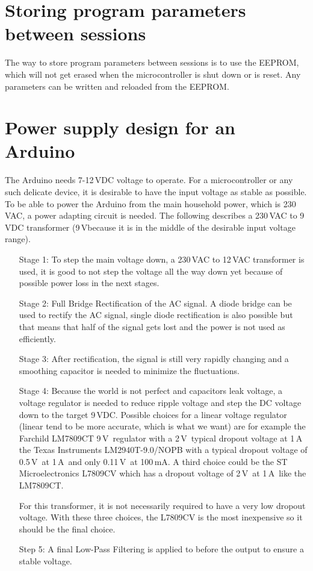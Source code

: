 \documentclass[11pt,a4paper,titlepage]{article}
\newcommand{\A}{\,\textrm{A}}
\newcommand{\mA}{\,\textrm{mA}}
\newcommand{\V}{\,\textrm{V}}
\begin{document}
	
	\section{Storing program parameters between sessions}
	The way to store program parameters between sessions is to use the \textsc{EEPROM}, which will not get erased when the microcontroller is shut down or is reset. Any parameters can be written and reloaded from the \textsc{EEPROM}.
	
	
	\section{Power supply design for an Arduino}
	The Arduino needs  7-12\V DC voltage to operate. For a microcontroller or any such delicate device, it is desirable to have the input voltage as stable as possible. To be able to power the Arduino from the main household power, which is 230\V AC, a power adapting circuit is needed. The following describes a 230\V AC to 9\V DC transformer (9\V because it is in the middle of the desirable input voltage range).
	
	\begin{enumerate}
		\item[Stage 1:]
		To step the main voltage down, a 230\V AC to 12\V AC transformer is used, it is good to not step the voltage all the way down yet because of possible power loss in the next stages.
		\item[Stage 2:]
		Full Bridge Rectification of the AC signal. A diode bridge can be used to rectify the AC signal, single diode rectification is also possible but that means that half of the signal gets lost and the power is not used as efficiently.
		\item[Stage 3:]
		After rectification, the signal is still very rapidly changing and a smoothing capacitor is needed to minimize the fluctuations.
		\item[Stage 4:]
		Because the world is not perfect and capacitors leak voltage, a voltage regulator is needed to  reduce  ripple voltage and step the DC voltage down to the target 9\V DC. Possible choices for a linear voltage regulator (linear tend to be more accurate, which is what we want) are for example the Farchild LM7809CT 9\V\ regulator with a 2\V\ typical dropout voltage at 1\A\, the Texas Instruments LM2940T-9.0/NOPB with a typical dropout voltage of 0.5\V\ at 1\A\ and only 0.11\V\ at 100\mA . A third choice could be the ST Microelectronics L7809CV which has a dropout voltage of 2\V\ at 1\A\ like the LM7809CT.
		
		For this transformer, it is not necessarily required to have a very low dropout voltage. With these three choices, the L7809CV is the most inexpensive so it should be the final choice.
		\item[Step 5:] A final Low-Pass Filtering is applied to before the output to ensure a stable voltage.
	\end{enumerate}
	
\end{document}
